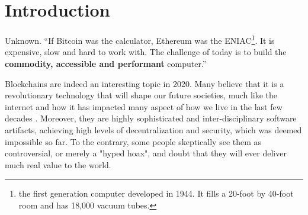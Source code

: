 \chapter{Introduction} \label{chap:intoroduction}

\ifpdf
    \graphicspath{{1_introduction/figures/PNG/}{1_introduction/figures/PDF/}{1_introduction/figures/}}
\else
    \graphicspath{{1_introduction/figures/EPS/}{1_introduction/figures/}}
\fi

\begin{chapquote}{Unknown.}
``If Bitcoin was the calculator, Ethereum was the ENIAC\footnote{the first generation computer
developed in 1944. It fills a 20-foot by 40-foot room and has 18,000 vacuum tubes.}. It is
expensive, slow and hard to work with. The challenge of today is to build the \textbf{commodity,
accessible and performant} computer.''
\end{chapquote}



Blockchains are indeed an interesting topic in 2020. Many believe that it is a revolutionary
technology that will shape our future societies, much like the internet and how it has impacted many
aspect of how we live in the last few decades \cite{will_blockchain_be_big_deal}. Moreover, they are
highly sophisticated and inter-disciplinary software artifacts, achieving high levels of
decentralization and security, which was deemed impossible so far. To the contrary, some people
skeptically see them as controversial, or merely a "hyped hoax", and doubt that they will ever
deliver much real value to the world.

